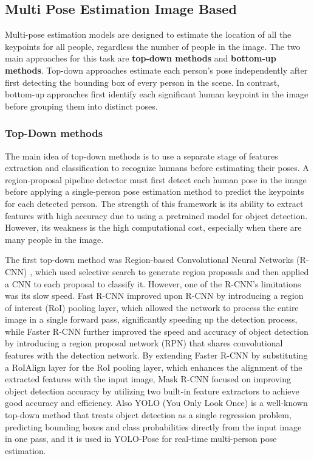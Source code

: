 \subsection{Multi Pose Estimation Image Based}
Multi-pose estimation models are designed to estimate the location of all the keypoints for all people, regardless the number of people in the image.
The two main approaches for this task are \textbf{top-down methods} and \textbf{bottom-up methods}. Top-down approaches estimate each person's pose independently after first detecting the bounding box of every person in the scene. In contrast, 
bottom-up approaches first identify each significant human keypoint in the image before grouping them into distinct poses.

\subsubsection{Top-Down methods}
The main idea of top-down methods is to use a separate stage of features extraction and classification to recognize humans before estimating their poses.
A region-proposal pipeline detector must first detect each human pose in the image before applying a single-person pose estimation method to predict the keypoints for each detected person. The strength of this framework is its ability
to extract features with high accuracy due to using a pretrained model for object detection. However, its weakness is the high computational cost, especially when there are many people in the image.

The first top-down method was Region-based Convolutional Neural Networks (R-CNN) \cite{girshick2014rich}, which used selective search to generate region proposals and then applied a CNN to each proposal to classify it. However, one 
of the R-CNN's limitations was its slow speed. Fast R-CNN \cite{girshick2015fast} improved upon R-CNN by introducing a region of interest (RoI) pooling layer, which allowed the network to process the entire image in a single forward pass, 
significantly speeding up the detection process, while Faster R-CNN \cite{ren2015faster} further improved the speed and accuracy of object detection by introducing a region proposal network (RPN) that shares convolutional features with 
the detection network. By extending Faster R-CNN by substituting a RoIAlign layer for the RoI pooling layer, which enhances the alignment of the extracted features with the input image, Mask R-CNN \cite{he2017mask} focused on improving object detection 
accuracy by utilizing two built-in feature extractors to achieve good accuracy and efficiency. Also YOLO (You Only Look Once) \cite{redmon2016you} is a well-known top-down method that treats object detection as a single regression problem, predicting bounding boxes 
and class probabilities directly from the input image in one pass, and it is used in YOLO-Pose \cite{maji2022yolo} for real-time multi-person pose estimation.

